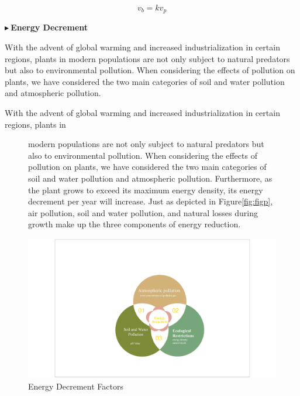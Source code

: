 \documentclass[12pt]{article}  %
\newenvironment{shrinkeq}[1]
{ \bgroup
	\addtolength\abovedisplayshortskip{#1}
	\addtolength\abovedisplayskip{#1}
	\addtolength\belowdisplayshortskip{#1}
	\addtolength\belowdisplayskip{#1}}
{\egroup\ignorespacesafterend}
\begin{document}
\vspace{-0.2cm}
\begin{shrinkeq}{-1ex}
	\begin{equation}
    \label{eq:eq6}
	    v_b=kv_p
	\end{equation}
\end{shrinkeq}

\vspace{-0.2cm}
\noindent$\blacktriangleright\ $\textbf{\small{Energy Decrement }}

With the advent of global warming and increased industrialization in certain regions, plants in modern populations are not only subject to natural predators but also to environmental pollution. When considering the effects of pollution on plants, we have considered the two main categories of soil and water pollution and atmospheric pollution. 

With the advent of global warming and increased industrialization in certain regions, plants in 

\newpage

\begin{figure}[htbp]
\begin{minipage}[b]{0.5\linewidth}
 modern populations are not only subject to natural predators but also to environmental pollution. When considering the effects of pollution on plants, we have considered the two main categories of soil and water pollution and atmospheric pollution. Furthermore, as the plant grows to exceed its maximum energy density, its energy decrement per year will increase. Just as depicted in Figure\eqref{fig:figp}, air pollution, soil and water pollution, and natural losses during growth make up the three components of energy reduction.     
\end{minipage}
\hfill
\begin{minipage}[b]{0.45\linewidth}
\centering
\includegraphics[height=9\baselineskip]{easymcm/img/pollution.pdf}
\caption{Energy Decrement Factors}
\label{fig:figp}
\end{minipage}
\end{figure}
\end{document}
